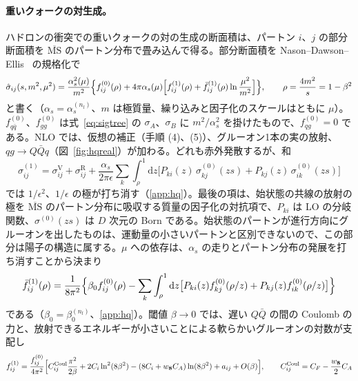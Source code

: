 \documentclass[a4paper,10pt]{ltjsarticle}
\newcommand{\dd}{\mathrm{d}}
\newcommand{\MSbar}{\overline{\mathrm{MS}}}
\begin{document}
\paragraph{重いクォークの対生成。}ハドロンの衝突での重いクォークの対の生成の断面積は、パートン $i$、$j$ の部分断面積を $\MSbar$ のパートン分布で畳み込んで得る。部分断面積を Nason--Dawson--Ellis~\cite{nde88} の規格化で
\begin{equation}
\hat\sigma_{ij}(s,m^2,\mu^2)=\frac{\alpha_s^2(\mu)}{m^2}\Bigl\{f^{(0)}_{ij}(\rho)+4\pi\alpha_s(\mu)\Bigl[f^{(1)}_{ij}(\rho)+\bar f^{(1)}_{ij}(\rho)\ln\frac{\mu^2}{m^2}\Bigr]\Bigr\},\qquad \rho=\frac{4m^2}{s}=1-\beta^2
\label{eq:hqf}
\end{equation}
と書く（$\alpha_s=\alpha_s^{(n_l)}$、$m$ は極質量、繰り込みと因子化のスケールはともに $\mu$）。$f^{(0)}_{q\bar q}$、$f^{(0)}_{gg}$ は式~\eqref{eq:sigtree} の $\sigma_A$、$\sigma_B$ に $m^2/\alpha_s^2$ を掛けたもので、$f^{(0)}_{qg}=0$ である。NLO では、仮想の補正（手順 (4)、(5)）、グルーオン1本の実の放射、$qg\to Q\bar Qq$（図~\ref{fig:hqreal}）が加わる。どれも赤外発散するが、和
\begin{equation}
\sigma^{(1)}_{ij}=\sigma^{\mathrm V}_{ij}+\sigma^{\mathrm R}_{ij}+\frac{\alpha_s}{2\pi\epsilon}\sum_k\int_\rho^1\dd z\bigl[P_{ki}(z)\,\sigma^{(0)}_{kj}(zs)+P_{kj}(z)\,\sigma^{(0)}_{ik}(zs)\bigr]
\label{eq:hqsum}
\end{equation}
では $1/\epsilon^2$、$1/\epsilon$ の極が打ち消す（\ref{app:hq}）。最後の項は、始状態の共線の放射の極を $\MSbar$ のパートン分布に吸収する質量の因子化の対抗項で、$P_{ki}$ は LO の分岐関数、$\sigma^{(0)}(zs)$ は $D$ 次元の Born である。始状態のパートンが進行方向にグルーオンを出したものは、運動量の小さいパートンと区別できないので、この部分は陽子の構造に属する。$\mu$ への依存は、$\alpha_s$ の走りとパートン分布の発展を打ち消すことから決まり
\begin{equation}
\bar f^{(1)}_{ij}(\rho)=\frac1{8\pi^2}\Bigl\{\beta_0f^{(0)}_{ij}(\rho)-\sum_k\int_\rho^1\dd z\bigl[P_{ki}(z)f^{(0)}_{kj}(\rho/z)+P_{kj}(z)f^{(0)}_{ik}(\rho/z)\bigr]\Bigr\}
\label{eq:hqfbar}
\end{equation}
である（$\beta_0=\beta_0^{(n_l)}$、\ref{app:hq}）。閾値 $\beta\to0$ では、遅い $Q\bar Q$ の間の Coulomb の力と、放射できるエネルギーが小さいことによる軟らかいグルーオンの対数が支配し
\begin{equation}
f^{(1)}_{ij}=\frac{f^{(0)}_{ij}}{4\pi^2}\Bigl[C^{\mathrm{Coul}}_{ij}\frac{\pi^2}{2\beta}+2C_i\ln^2(8\beta^2)-(8C_i+w_{\mathbf 8}C_A)\ln(8\beta^2)+a_{ij}+O(\beta)\Bigr],\qquad
C^{\mathrm{Coul}}_{ij}=C_F-\frac{w_{\mathbf 8}}2C_A
\label{eq:hqthr}
\end{equation}
\end{document}
